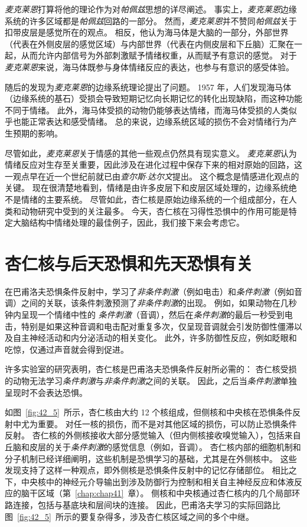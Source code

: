 \textit{麦克莱恩}打算将他的理论作为对\textit{帕佩兹}思想的详尽阐述。
事实上，\textit{麦克莱恩}边缘系统的许多区域都是\textit{帕佩兹}回路的一部分。
然而，\textit{麦克莱恩}并不赞同\textit{帕佩兹}关于扣带皮层是感觉所在的观点。
相反，他认为海马体是大脑的一部分，外部世界（代表在外侧皮层的感觉区域）与内部世界（代表在内侧皮层和下丘脑）汇聚在一起，从而允许内部信号为外部刺激赋予情绪权重，从而赋予有意识的感觉。
对于\textit{麦克莱恩}来说，海马体既参与身体情绪反应的表达，也参与有意识的感受体验。


随后的发现为\textit{麦克莱恩}的边缘系统理论提出了问题。
1957 年，人们发现海马体（边缘系统的基石）受损会导致短期记忆向长期记忆的转化出现缺陷，而这种功能不同于情绪。
此外，海马体受损的动物仍能够表达情绪，而海马体受损的人类似乎也能正常表达和感受情绪。
总的来说，边缘系统区域的损伤不会对情绪行为产生预期的影响。


尽管如此，\textit{麦克莱恩}关于情感的其他一些观点仍然具有现实意义。
\textit{麦克莱恩}认为情绪反应对生存至关重要，因此涉及在进化过程中保存下来的相对原始的回路，这一观点早在近一个世纪前就已由\textit{查尔斯$\cdot$达尔文}提出。
这个概念是情感进化观点的关键。
现在很清楚地看到，情绪是由许多皮层下和皮层区域处理的，边缘系统绝不是情绪的主要系统。
尽管如此，杏仁核是原始边缘系统的一个组成部分，在人类和动物研究中受到的关注最多。
今天，杏仁核在习得性恐惧中的作用可能是特定大脑结构中情绪处理的最佳例子，因此，我们接下来会考虑它。



\section{杏仁核与后天恐惧和先天恐惧有关}

在巴甫洛夫恐惧条件反射中，学习了\textit{非条件刺激}（例如电击）和\textit{条件刺激}（例如音调）之间的关联，该条件刺激预测了\textit{非条件刺激}的出现。
例如，如果动物在几秒钟内呈现一个情绪中性的 \textit{条件刺激}（音调），然后在\textit{条件刺激}的最后一秒受到电击，特别是如果这种音调和电击配对重复多次，仅呈现音调就会引发防御性僵滞以及自主神经活动和内分泌活动的相关变化。
此外，许多防御性反应，例如眨眼和吃惊，仅通过声音就会得到促进。


许多实验室的研究表明，杏仁核是巴甫洛夫恐惧条件反射所必需的：
杏仁核受损的动物无法学习\textit{条件刺激}与\textit{非条件刺激}之间的关联。
因此，之后当\textit{条件刺激}单独呈现时不会表达恐惧。


如图~\ref{fig:42_5}~所示，杏仁核由大约 12 个核组成，但侧核和中央核在恐惧条件反射中尤为重要。
对任一核的损伤，而不是对其他区域的损伤，可以防止恐惧条件反射。
杏仁核的外侧核接收大部分感觉输入（但内侧核接收嗅觉输入），包括来自丘脑和皮层的关于\textit{条件刺激}的感觉信息（例如，音调）。
杏仁核内部的细胞机制和分子机制已经详细阐明，这些机制是恐惧学习的基础，尤其是在外侧核中。
这些发现支持了这样一种观点，即外侧核是恐惧条件反射中的记忆存储部位。
相比之下，中央核中的神经元介导输出到涉及防御行为控制和相关自主神经反应和体液反应的脑干区域（第~\ref{chap:chap41}~章）。
侧核和中央核通过杏仁核内的几个局部环路连接，包括与基底块和层间块的连接。
因此，巴甫洛夫学习的实际回路比图~\ref{fig:42_5}~所示的要复杂得多，涉及杏仁核区域之间的多个中继。


